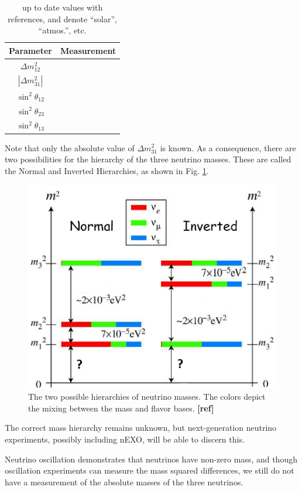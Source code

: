 \begin{table}[!htbp]
\caption{up to date values with references, and denote ``solar'', ``atmos.'', etc.} %
\label{table:nu_osc_vals}
\begin{tabular}{c|c}
Parameter & Measurement \\
\hline
$\Delta m_{12}^{2}$ & \\
$|\Delta m_{31}^{2}|$ & \\
$\sin^{2} \theta_{12}$ & \\
$\sin^{2} \theta_{23}$ & \\
$\sin^{2} \theta_{13}$ & \\
\end{tabular}
\end{table}

Note that only the absolute value of $\Delta m_{31}^{2}$ is known.  As a consequence, there are two possibilities for the hierarchy of the three neutrino masses.  These are called the Normal and Inverted Hierarchies, as shown in Fig. \ref{fig:numasshier}.

\begin{figure}[H]
        \centering
                \includegraphics[width=.5\textwidth]{figures/hierarchy_alterred.png}
                \caption{The two possible hierarchies of neutrino masses.  The colors depict the mixing between the mass and flavor bases. {\color{red}\textbf{[ref]}}}
\label{fig:numasshier}
\end{figure}

\noindent
The correct mass hierarchy remains unknown, but next-generation neutrino experiments, possibly including nEXO, will be able to discern this.

Neutrino oscillation demonstrates that neutrinos have non-zero mass, and though oscillation experiments can measure the mass squared differences, we still do not have a measurement of the absolute masses of the three neutrinos.

